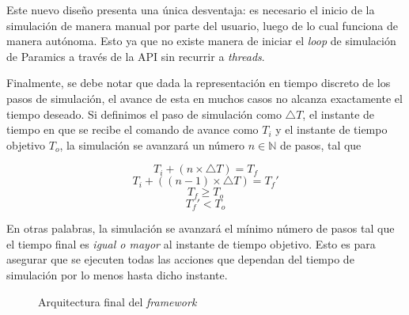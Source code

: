 Este nuevo diseño presenta una única desventaja: es necesario el inicio de la simulación de manera manual por parte del usuario, luego de lo cual funciona de manera autónoma. Esto ya que no existe manera de iniciar el \emph{loop} de simulación de Paramics a través de la API sin recurrir a \emph{threads}.

Finalmente, se debe notar que dada la representación en tiempo discreto de los pasos de simulación, el avance de esta en muchos casos no alcanza exactamente el tiempo deseado. Si definimos el paso de simulación como $\triangle T$, el instante de tiempo en que se recibe el comando de avance como $T_{i}$ y el instante de tiempo objetivo $T_{o}$, la simulación se avanzará un número $n \in \mathbb{N}$ de pasos, tal que

\[ T_{i} + (n \times \triangle T) = T_{f} \]
\[ T_{i} + ((n - 1) \times \triangle T) = T_{f}' \]
\[ T_{f} \geq T_{o} \]
\[ T_{f}' < T_{o} \]

En otras palabras, la simulación se avanzará el mínimo número de pasos tal que el tiempo final es \emph{igual o mayor} al instante de tiempo objetivo. Esto es para asegurar que se ejecuten todas las acciones que dependan del tiempo de simulación por lo menos hasta dicho instante.

\begin{figure}[htpb]
    \centering
    
    \caption{Arquitectura final del \emph{framework}}
    \label{fig:ptraci_arch2}
\end{figure}
